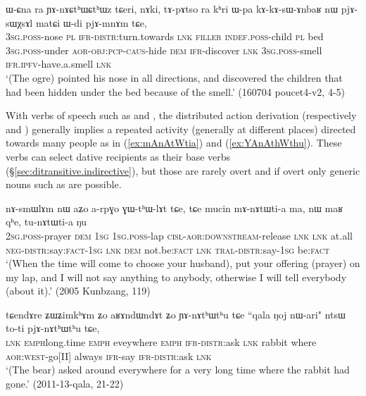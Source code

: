 \begin{exe}
\ex \label{ex:WCna.YAnACthWCthWz}
\gll  ɯ-ɕna ra ɲɤ-nɤɕtʰɯɕtʰɯz tɕeri, nɤki, tɤ-pɤtso ra kʰri ɯ-pa kɤ-kɤ-sɯ-ɤnbaʁ nɯ pjɤ-sɯχsɤl matɕi ɯ-di pjɤ-mnɤm tɕe, \\
\textsc{3sg}.\textsc{poss}-nose \textsc{pl} \textsc{ifr}-\textsc{distr}:turn.towards \textsc{lnk} \textsc{filler} \textsc{indef}.\textsc{poss}-child \textsc{pl} bed \textsc{3sg}.\textsc{poss}-under \textsc{aor}-\textsc{obj}:\textsc{pcp}-\textsc{caus}-hide \textsc{dem} \textsc{ifr}-discover \textsc{lnk} \textsc{3sg}.\textsc{poss}-smell \textsc{ifr}.\textsc{ipfv}-have.a.smell \textsc{lnk} \\
\glt `(The ogre) pointed his nose in all directions, and discovered the children that had been hidden under the bed because of the smell.' (160704 poucet4-v2, 4-5)
\end{exe}

With verbs of speech such as  and , the distributed action derivation (respectively  and ) generally implies a repeated activity (generally at different places) directed towards many people as in (\ref{ex:mAnAtWtia}) and (\ref{ex:YAnAthWthu}). These verbs can select dative recipients as their base verbs (§\ref{sec:ditransitive.indirective}), but those are rarely overt and if overt only generic nouns such as  are possible.

\begin{exe}
\ex \label{ex:mAnAtWtia}
\gll  nɤ-smɯlɤm nɯ aʑo a-rpɣo ɣɯ-tʰɯ-lɤt tɕe, tɕe mucin mɤ-nɤtɯti-a ma,
nɯ maʁ qʰe, tu-nɤtɯti-a ŋu \\
\textsc{2sg}.\textsc{poss}-prayer \textsc{dem} \textsc{1sg} \textsc{1sg}.\textsc{poss}-lap \textsc{cisl}-\textsc{aor}:\textsc{downstream}-release \textsc{lnk} \textsc{lnk} at.all \textsc{neg}-\textsc{distr}:say:\textsc{fact}-\textsc{1sg} \textsc{lnk} \textsc{dem} not.be:\textsc{fact} \textsc{lnk} \textsc{tral}-\textsc{distr}:say-\textsc{1sg} be:\textsc{fact} \\
\glt `(When the time will come to choose your husband), put your offering (prayer) on my lap, and I will not say anything to anybody, otherwise I will tell everybody (about it).' (2005 Kunbzang, 119)
\end{exe}

\begin{exe}
\ex \label{ex:YAnAthWthu}
\gll tɕendɤre ʑɯ\redp{}ʑimkʰɤm ʑo aʁɤndɯndɤt ʑo ɲɤ-nɤtʰɯtʰu tɕe ``qala ŋoj nɯ-ari" ntsɯ to-ti pjɤ-nɤtʰɯtʰu tɕe, \\
\textsc{lnk} \textsc{emph}\redp{}long.time \textsc{emph} eveywhere \textsc{emph} \textsc{ifr}-\textsc{distr}:ask \textsc{lnk} rabbit where \textsc{aor}:\textsc{west}-go[II] always \textsc{ifr}-say \textsc{ifr}-\textsc{distr}:ask \textsc{lnk} \\
\glt `(The bear) asked around everywhere for a very long time where the rabbit had gone.' (2011-13-qala, 21-22)
\end{exe}

